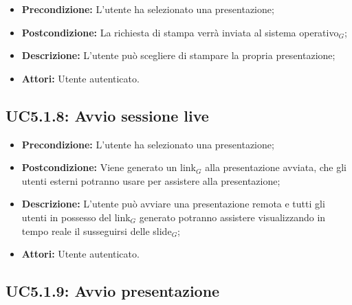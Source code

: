 \begin{itemize}
	\item \textbf{Precondizione:} L'utente ha selezionato una presentazione;
	\item \textbf{Postcondizione:} La richiesta di stampa verrà inviata al sistema operativo$_G$;
	\item \textbf{Descrizione:} L'utente può scegliere di stampare la propria presentazione;
	\item \textbf{Attori:} Utente autenticato.
\end{itemize}
\subsection{ UC5.1.8: Avvio sessione live}

\begin{itemize}
	\item \textbf{Precondizione:} L'utente ha selezionato una presentazione;
	\item \textbf{Postcondizione:} Viene generato un link$_G$ alla presentazione avviata, che gli utenti esterni potranno usare per assistere alla presentazione;
	\item \textbf{Descrizione:} L'utente può avviare una presentazione remota e tutti gli utenti in possesso del link$_G$ generato potranno assistere visualizzando in tempo reale il susseguirsi delle slide$_G$;
	\item \textbf{Attori:} Utente autenticato.
\end{itemize}

\newpage
\subsection{ UC5.1.9: Avvio presentazione }

